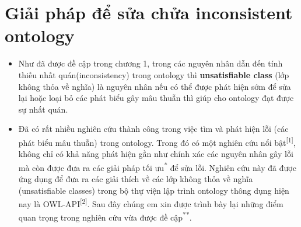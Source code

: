 \chapter{Giải pháp để sửa chửa inconsistent ontology}
{\let\thefootnote\relax{}
\let\thefootnote\relax{}
}
\begin{itemize}
\item
Như đã được đề cập trong chương 1, trong các nguyên nhân dẫn đến tính thiếu nhất quán(inconsistency) trong ontology thì \textbf{unsatisfiable class} (lớp không thỏa về nghĩa) là nguyên nhân nếu có thể được phát hiện sớm để sửa lại hoặc loại bỏ các phát biểu gây mâu thuẫn thì giúp cho ontology đạt được sự nhất quán. 
\item
Đã có rất nhiều nghiên cứu thành công trong việc tìm và phát hiện lỗi (các phát biểu mâu thuẫn) trong ontology. Trong đó có một nghiên cứu nổi bật\textsuperscript{[1]}, không chỉ có khả năng phát hiện gần như chính xác các nguyên nhân gây lỗi mà còn được đưa ra các giải pháp tối ưu\textsuperscript{*} để sửa lỗi. Nghiên cứu này đã được ứng dụng để đưa ra các giải thích về các lớp không thỏa về nghĩa (unsatisfiable classes) trong bộ thự viện lập trình ontology thông dụng hiện nay là OWL-API\textsuperscript{[2]}. Sau đây chúng em xin được trình bày lại những điểm quan trọng trong nghiên cứu vừa được đề cập\textsuperscript{**}.
\end{itemize}
\clearpage
{\let\thefootnote\relax{}}
